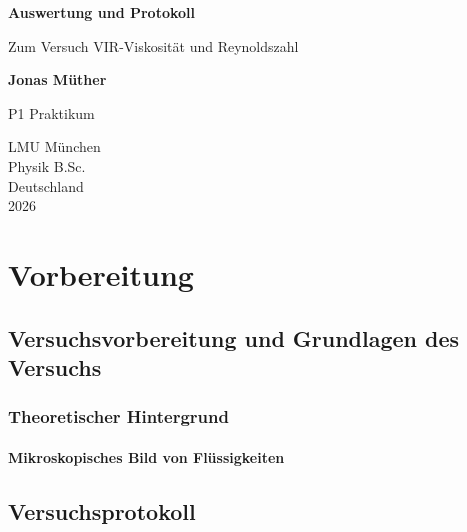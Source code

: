 \documentclass{report}
\begin{document}

\begin{titlepage}
    \begin{center}
        \vspace*{1cm}
            
        \Huge
        \textbf{Auswertung und Protokoll}
            
        \vspace{0.5cm}
        \LARGE
        Zum Versuch VIR-Viskosität und Reynoldszahl
        
        \vspace{1.8cm}

        \textbf{Jonas Müther}
        \vfill
            
        P1 Praktikum\\
       
            
        \vspace{0.8cm}
  

        \vspace{1.8cm}
        \Large
        LMU München \\
        Physik B.Sc.\\
        Deutschland\\
        2026
            
    \end{center}
\end{titlepage}
\tableofcontents

\newpage
\chapter{Vorbereitung}

\section{Versuchsvorbereitung und Grundlagen des Versuchs}
\subsection{Theoretischer Hintergrund}
\subsubsection*{Mikroskopisches Bild von Flüssigkeiten}


\section{Versuchsprotokoll}

\end{document}
